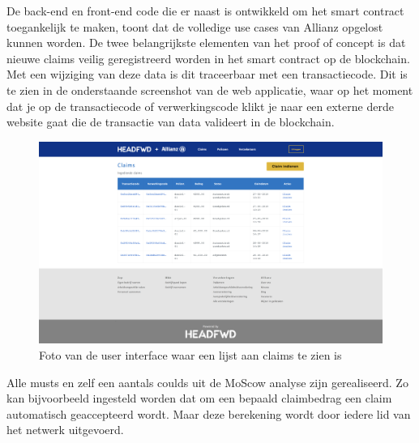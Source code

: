 De back-end en front-end code die er naast is ontwikkeld om het smart contract toegankelijk te maken, toont dat de volledige use cases van Allianz opgelost kunnen worden. De twee belangrijkste elementen van het proof of concept is dat nieuwe claims veilig geregistreerd worden in het smart contract op de blockchain. Met een wijziging van deze data is dit traceerbaar met een transactiecode. Dit is te zien in de onderstaande screenshot van de web applicatie, waar op het moment dat je op de transactiecode of verwerkingscode klikt je naar een externe derde website gaat die de transactie van data valideert in de blockchain.
\begin{figure}[h]
    \begin{center}
        \includegraphics[width=\paperwidth-200pt]{images/claim-list}
        \caption{Foto van de user interface waar een lijst aan claims te zien is}
        \label{fig:claim-list}
    \end{center}
\end{figure}
Alle musts en zelf een aantals coulds uit de MoScow analyse zijn gerealiseerd. Zo kan bijvoorbeeld ingesteld worden dat om een bepaald claimbedrag een claim automatisch geaccepteerd wordt. Maar deze berekening wordt door iedere lid van het netwerk uitgevoerd.